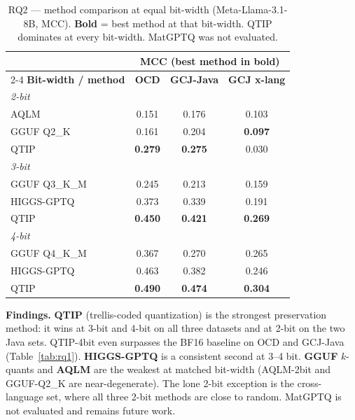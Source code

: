 \documentclass[11pt]{article}
\newcommand{\best}[1]{\textbf{#1}}
\begin{document}
\begin{table}[htbp]
  \centering
  \caption{RQ2 --- method comparison at equal bit-width (Meta-Llama-3.1-8B,
           MCC). \best{Bold} = best method at that bit-width. QTIP dominates at
           every bit-width. MatGPTQ was not evaluated.}
  \label{tab:rq2}
  \small
  \begin{tabular}{lccc}
    \toprule
    & \multicolumn{3}{c}{\textbf{MCC (best method in bold)}}\\
    \cmidrule(lr){2-4}
    \textbf{Bit-width / method} & \textbf{OCD} & \textbf{GCJ-Java} & \textbf{GCJ x-lang} \\
    \midrule
    \textit{2-bit} \\
    \quad AQLM         & 0.151 & 0.176 & 0.103 \\
    \quad GGUF Q2\_K   & 0.161 & 0.204 & \best{0.097} \\
    \quad QTIP         & \best{0.279} & \best{0.275} & 0.030 \\
    \midrule
    \textit{3-bit} \\
    \quad GGUF Q3\_K\_M & 0.245 & 0.213 & 0.159 \\
    \quad HIGGS-GPTQ    & 0.373 & 0.339 & 0.191 \\
    \quad QTIP          & \best{0.450} & \best{0.421} & \best{0.269} \\
    \midrule
    \textit{4-bit} \\
    \quad GGUF Q4\_K\_M & 0.367 & 0.270 & 0.265 \\
    \quad HIGGS-GPTQ    & 0.463 & 0.382 & 0.246 \\
    \quad QTIP          & \best{0.490} & \best{0.474} & \best{0.304} \\
    \bottomrule
  \end{tabular}
\end{table}

\noindent\textbf{Findings.} \textbf{QTIP} (trellis-coded quantization) is the
strongest preservation method: it wins at 3-bit and 4-bit on all three datasets
and at 2-bit on the two Java sets. QTIP-4bit even surpasses the BF16 baseline on
OCD and GCJ-Java (Table~\ref{tab:rq1}). \textbf{HIGGS-GPTQ} is a consistent
second at 3--4 bit. \textbf{GGUF} $k$-quants and \textbf{AQLM} are the weakest at
matched bit-width (AQLM-2bit and GGUF-Q2\_K are near-degenerate). The lone 2-bit
exception is the cross-language set, where all three 2-bit methods are close to
random. MatGPTQ is not evaluated and remains future work.

\end{document}
